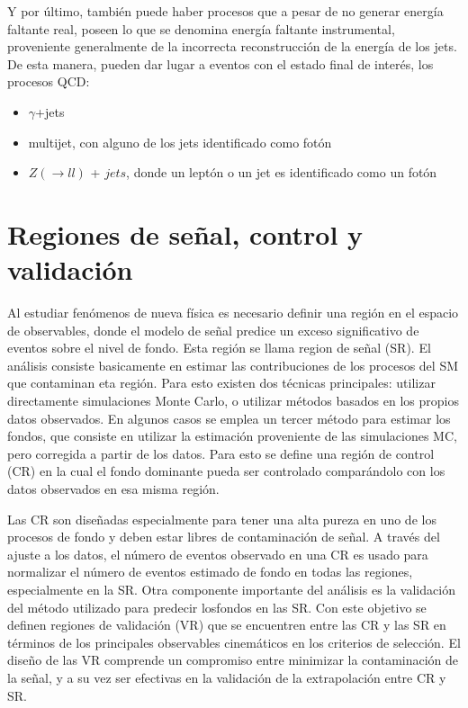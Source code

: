 Y por último, también puede haber procesos que a pesar de no generar energía faltante real, poseen lo que se denomina energía faltante instrumental, proveniente generalmente de la incorrecta reconstrucción de la energía de los jets. De esta manera, pueden dar lugar a eventos con el estado final de interés, los procesos QCD:

\begin{itemize}

	\item $\gamma$+jets

	\item multijet, con alguno de los jets identificado como fotón

	\item $Z(\rightarrow ll)$ + $jets$, donde un leptón o un jet es identificado como un fotón

\end{itemize}



\section{Regiones de señal, control y validación}

Al estudiar fenómenos de nueva física es necesario definir una región en el espacio de observables, donde el modelo de señal predice un exceso significativo de eventos sobre el nivel de fondo. Esta región se llama region de señal (SR). El análisis consiste basicamente en estimar las contribuciones de los procesos del SM que contaminan eta región. Para esto existen dos técnicas principales: utilizar directamente simulaciones Monte Carlo, o utilizar métodos basados en los propios datos observados. En algunos casos se emplea un tercer método para estimar los fondos, que consiste en utilizar la estimación proveniente de las simulaciones MC, pero corregida a partir de los datos. Para esto se define una región de control (CR) en la cual el fondo dominante pueda ser controlado comparándolo con los
datos observados en esa misma región. 

Las CR son diseñadas especialmente para tener una alta pureza en uno de los procesos de fondo y deben estar libres de contaminación de señal. A través del ajuste a los datos, el número de eventos observado en una CR es usado para normalizar el número de eventos estimado de fondo en todas las regiones, especialmente en la SR. Otra componente importante del análisis es la validación del método utilizado para predecir losfondos en las SR. Con este objetivo se definen regiones de validación (VR) que se encuentren entre las CR y las SR en términos de los principales observables cinemáticos en los criterios de selección. El diseño de las VR comprende un compromiso entre minimizar la contaminación de la señal, y a su vez ser efectivas en la validación de la extrapolación entre CR y SR. 